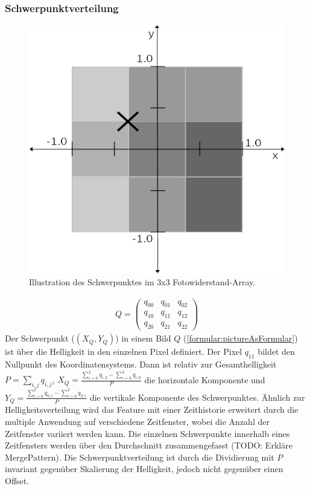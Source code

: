 \subsubsection{Schwerpunktverteilung}
\begin{figure}
    \centering
    \includegraphics[width=0.5\linewidth]{images/schwerpunkt_ansatz.jpg}
    \caption{Illustration des Schwerpunktes im 3x3 Fotowiderstand-Array.}
    \label{fig:schwerpunkt}
\end{figure}
\begin{align}
    Q = \begin{pmatrix}
            q_{00} & q_{01} & q_{02} \\
            q_{10} & q_{11} & q_{12} \\
            q_{20} & q_{21} & q_{22}
    \end{pmatrix}
    \label{formular:pictureAsFormular}
\end{align}
Der Schwerpunkt ($(X_Q, Y_Q)$) in einem Bild $Q$ (\ref{formular:pictureAsFormular}) ist über die Helligkeit in den einzelnen Pixel definiert. Der Pixel $q_{11}$ bildet den Nullpunkt des Koordinatensystems.
Dann ist relativ zur Gesamthelligkeit $P = \sum_{i,j} q_{i,j}$, $X_Q=\frac{\sum_{i=0}^{2} q_{i,2} - \sum_{i=0}^{2} q_{i,0}}{P}$ die horizontale Komponente
und $Y_Q = \frac{\sum_{i=0}^{2} q_{0,i} - \sum_{i=0}^{2} q_{2,i}}{P}$ die vertikale Komponente des Schwerpunktes.
\newline
\newline
Ähnlich zur Helligkeitsverteilung wird das Feature mit einer Zeithistorie erweitert durch die multiple Anwendung auf verschiedene Zeitfenster, wobei die Anzahl der Zeitfenster variiert werden kann. Die
einzelnen Schwerpunkte innerhalb eines Zeitfensters werden über den Durchschnitt zusammengefasst (TODO: Erkläre MergePattern).
\newline
\newline
Die Schwerpunktverteilung ist durch die Dividierung mit $P$ invariant gegenüber Skalierung der Helligkeit, jedoch nicht gegenüber einen Offset.
